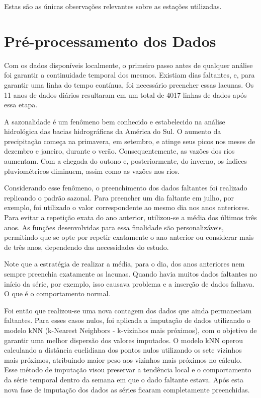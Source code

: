 Estas são as únicas observações relevantes sobre as estações utilizadas.

\section{Pré-processamento dos Dados}

Com os dados disponíveis localmente, o primeiro passo antes de qualquer análise foi garantir a continuidade temporal dos mesmos. Existiam dias faltantes, e, para garantir uma linha do tempo contínua, foi necessário preencher essas lacunas. Os 11 anos de dados diários resultaram em um total de 4017 linhas de dados após essa etapa.

A sazonalidade é um fenômeno bem conhecido e estabelecido na análise hidrológica das bacias hidrográficas da América do Sul. O aumento da precipitação começa na primavera, em setembro, e atinge seus picos nos meses de dezembro e janeiro, durante o verão. Consequentemente, as vazões dos rios aumentam. Com a chegada do outono e, posteriormente, do inverno, os índices pluviométricos diminuem, assim como as vazões nos rios. \cite{rayyan-39677094}

Considerando esse fenômeno, o preenchimento dos dados faltantes foi realizado replicando o padrão sazonal. Para preencher um dia faltante em julho, por exemplo, foi utilizado o valor correspondente ao mesmo dia nos anos anteriores. Para evitar a repetição exata do ano anterior, utilizou-se a média dos últimos três anos. As funções desenvolvidas para essa finalidade são personalizáveis, permitindo que se opte por repetir exatamente o ano anterior ou considerar mais de três anos, dependendo das necessidades do estudo. 

Note que a estratégia de realizar a média, para o dia, dos anos anteriores nem sempre preenchia exatamente as lacunas. Quando havia muitos dados faltantes no início da série, por exemplo, isso causava problema e a inserção de dados falhava. O que é o comportamento normal.

Foi então que realizou-se uma nova contagem dos dados que ainda permaneciam faltantes. Para esses casos nulos, foi aplicada a imputação de dados utilizando o modelo kNN (k-Nearest Neighbors - k-vizinhos mais próximos), com o objetivo de garantir uma melhor dispersão dos valores imputados. O modelo kNN operou calculando a distância euclidiana dos pontos nulos utilizando os sete vizinhos mais próximos, atribuindo maior peso aos vizinhos mais próximos no cálculo. Esse método de imputação visou preservar a tendência local e o comportamento da série temporal dentro da semana em que o dado faltante estava. Após esta nova fase de imputação dos dados as séries ficaram completamente preenchidas.


